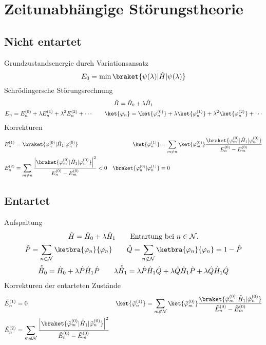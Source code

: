 \section{Zeitunabhängige Störungstheorie}

\subsection{Nicht entartet}

Grundzustandsenergie durch Variationsansatz \cite[Glg. 5.3]{qm}
\begin{equation*}
    E_0 = \min\braket{\psi(\lambda)|\hat{H}|\psi(\lambda)}
\end{equation*}
Schrödingersche Störungsrechnung \cite[Glg. 5.15, 5.16]{qm}
\begin{gather*}
	    \hat{H} = \hat{H}_0 + \lambda\hat{H}_1 \\
	    E_n =E_n^{(0)} + \lambda E_n^{(1)} + \lambda^2 E_n^{(2)} + \cdots \qquad \ket{\varphi_n} = \ket{\varphi_n^{(0)}} + \lambda\ket{\varphi_n^{(1)}} + \lambda^2\ket{\varphi_n^{(2)}} + \cdots
\end{gather*}
Korrekturen \cite[Glg. 5.19, 5.22, 5.25, 5.23]{qm}
\begin{align*}
	E_n^{(1)} &= \braket{\varphi_n^{(0)} | \hat{H}_1 | \varphi_n^{(0)}} & \ket{\varphi_n^{(1)}} &= \sum_{m \neq n} \ket{\varphi_m^{(0)}}\frac{\braket{\varphi_m^{(0)} | \hat{H}_1 | \varphi_n^{(0)}}}{E_n^{(0)} - E_m^{(0)}} \\
	E_n^{(2)} &= \sum_{m \neq n} \frac{\left| \braket{\varphi_m^{(0)} | \hat{H}_1 | \varphi_n^{(0)}} \right|^2}{E_n^{(0)} - E_m^{(0)}} < 0 & \braket{\varphi_n^{(0)}|\varphi_n^{(1)}} &= 0
\end{align*}

\subsection{Entartet}

Aufspaltung \cite[S. 169]{qm}
\begin{gather*}
	\hat{H}=\hat{H}_0+\lambda\hat{H}_1 \qquad \text{Entartung bei $n\in\mathcal{N}$.} \\
	\hat{P}=\sum_{n\in\mathcal{N}}\ketbra{\varphi_n}{\varphi_n} \qquad \hat{Q}=\sum_{n\not\in\mathcal{N}}\ketbra{\varphi_n}{\varphi_n}=1-\hat{P} \\\hat{\tilde{H}}_0=\hat{H}_0+\lambda\hat{P}\hat{H}_1\hat{P} \qquad \lambda\hat{\tilde{H}}_1=\lambda\hat{P}\hat{H}_1\hat{Q}+\lambda\hat{Q}\hat{H}_1\hat{P}+\lambda\hat{Q}\hat{H}_1\hat{Q}
\end{gather*}
Korrekturen der entarteten Zustände \cite[Glg. 5.37, 5.38, 5.39]{qm}
\begin{align*}
	\tilde{E}_n^{(1)} &= 0 & \ket{\tilde{\varphi}_n^{(1)}} &= \sum_{m\not\in\mathcal{N}}\ket{\tilde{\varphi}_m^{(0)}}\frac{\braket{\tilde{\varphi}_m^{(0)}|\hat{H}_1|\tilde{\varphi}_n^{(0)}}}{\tilde{E}_n^{(0)}-\tilde{E}_m^{(0)}} \\
	\tilde{E}_n^{(2)} &= \sum_{m\not\in\mathcal{N}}\frac{\left|\braket{\tilde{\varphi}_m^{(0)}|\hat{H}_1|\tilde{\varphi}_n^{(0)}}\right|^2}{\tilde{E}_n^{(0)}-\tilde{E}_m^{(0)}}
\end{align*}

